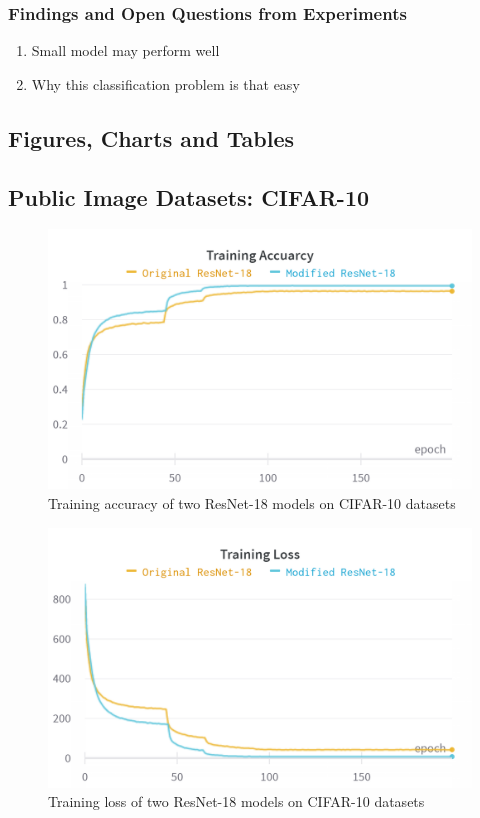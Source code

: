 \documentclass[twocolumn]{extarticle}
\begin{document}
\subsubsection{Findings and Open Questions from Experiments}

\begin{enumerate}
\item Small model may perform well
\item Why this classification problem is that easy
\end{enumerate}

\clearpage
{}%
\renewcommand*{\thepage}{A. \arabic{page}}
\begin{appendices}
\section{Figures, Charts and Tables}

\subsection{Public Image Datasets: CIFAR-10}

\begin{figure}[H]
\centering
\includegraphics[width=0.9\linewidth]{charts/Section-2-Panel-0-uzzeut0la}
\caption{Training accuracy of two ResNet-18 models on CIFAR-10 datasets}
\label{chart: res_1}
\end{figure}

\begin{figure}[H]
\centering
\includegraphics[width=0.9\linewidth]{charts/Section-2-Panel-1-crmf3l46q}
\caption{Training loss of two ResNet-18 models on CIFAR-10 datasets}
\label{chart: res_2}
\end{figure}


\end{appendices}
\end{document}

